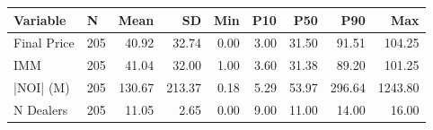 \begin{tabular}{llrrrrrrr}
\toprule
   Variable &   N &   Mean &     SD &  Min &  P10 &   P50 &    P90 &     Max \\
\midrule
Final Price & 205 &  40.92 &  32.74 & 0.00 & 3.00 & 31.50 &  91.51 &  104.25 \\
        IMM & 205 &  41.04 &  32.00 & 1.00 & 3.60 & 31.38 &  89.20 &  101.25 \\
  |NOI| (M) & 205 & 130.67 & 213.37 & 0.18 & 5.29 & 53.97 & 296.64 & 1243.80 \\
  N Dealers & 205 &  11.05 &   2.65 & 0.00 & 9.00 & 11.00 &  14.00 &   16.00 \\
\bottomrule
\end{tabular}
